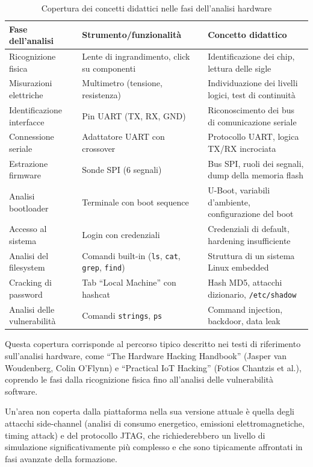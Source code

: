 \begin{table}[H]
\centering
\caption{Copertura dei concetti didattici nelle fasi dell'analisi hardware}
\begin{tabularx}{\textwidth}{X X X}
\toprule
\textbf{Fase dell'analisi} & \textbf{Strumento/funzionalità} & \textbf{Concetto didattico} \\
\midrule
Ricognizione fisica & Lente di ingrandimento, click su componenti & Identificazione dei chip, lettura delle sigle \\
Misurazioni elettriche & Multimetro (tensione, resistenza) & Individuazione dei livelli logici, test di continuità \\
Identificazione interfacce & Pin UART (TX, RX, GND) & Riconoscimento dei bus di comunicazione seriale \\
Connessione seriale & Adattatore UART con crossover & Protocollo UART, logica TX/RX incrociata \\
Estrazione firmware & Sonde SPI (6 segnali) & Bus SPI, ruoli dei segnali, dump della memoria flash \\
Analisi bootloader & Terminale con boot sequence & U-Boot, variabili d'ambiente, configurazione del boot \\
Accesso al sistema & Login con credenziali & Credenziali di default, hardening insufficiente \\
Analisi del filesystem & Comandi built-in (\texttt{ls}, \texttt{cat}, \texttt{grep}, \texttt{find}) & Struttura di un sistema Linux embedded \\
Cracking di password & Tab ``Local Machine'' con hashcat & Hash MD5, attacchi dizionario, \texttt{/etc/shadow} \\
Analisi delle vulnerabilità & Comandi \texttt{strings}, \texttt{ps} & Command injection, backdoor, data leak \\
\bottomrule
\end{tabularx}
\end{table}

Questa copertura corrisponde al percorso tipico descritto nei testi di riferimento sull'analisi hardware, come ``The Hardware Hacking Handbook'' (Jasper van Woudenberg, Colin O'Flynn) e ``Practical IoT Hacking'' (Fotios Chantzis et al.), coprendo le fasi dalla ricognizione fisica fino all'analisi delle vulnerabilità software.

Un'area non coperta dalla piattaforma nella sua versione attuale è quella degli attacchi side-channel (analisi di consumo energetico, emissioni elettromagnetiche, timing attack) e del protocollo JTAG, che richiederebbero un livello di simulazione significativamente più complesso e che sono tipicamente affrontati in fasi avanzate della formazione.

